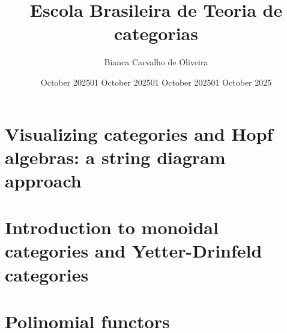 \documentclass[a4paper,english,11pt]{article}
\title{Escola Brasileira de Teoria de categorias}
\author{Bianca Carvalho de Oliveira}
\date{October 2025}
\theoremstyle{definition}
\theoremstyle{plain}
\theoremstyle{remark}
\begin{document}
\maketitle
\section{Visualizing categories and Hopf algebras: a string diagram approach}
\date{01 October 2025}

\section{Introduction to monoidal categories and Yetter-Drinfeld categories}
\date{01 October 2025}

\section{Polinomial functors}
\date{01 October 2025}
\end{document}

